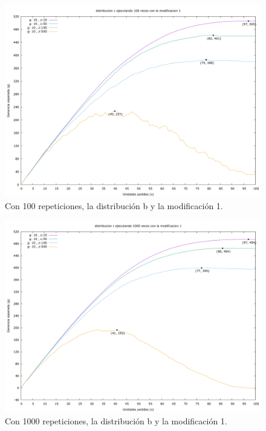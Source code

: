 \documentclass[12pt, spanish]{article}
\begin{document}
\begin{figure}[H]
	\centering
	\includegraphics[scale = 0.2]{prob_c/datos_c_100_1.png}
	\caption{Con 100 repeticiones, la distribución b y la modificación 1.}
	\label{fig:ej1_a_100}

\end{figure}

\begin{figure}[H]
	\centering
	\includegraphics[scale = 0.2]{prob_c/datos_c_1000_1.png}
	\caption{Con 1000 repeticiones, la distribución b y la modificación 1.}
	\label{fig:ej1_a_1000}

\end{figure}
\end{document}
